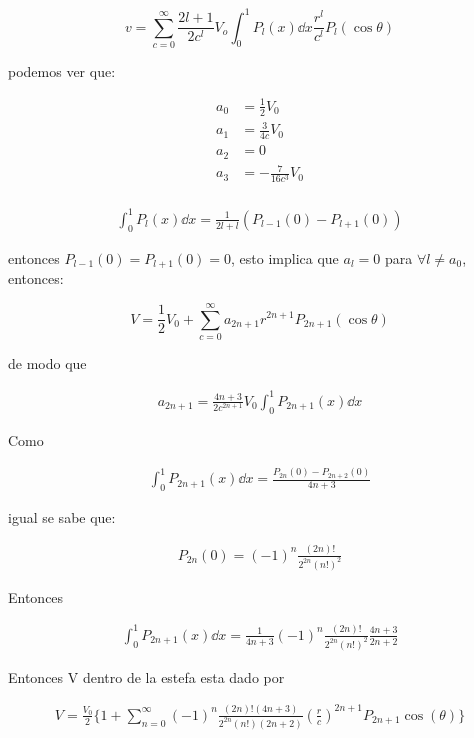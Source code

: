 \documentclass[11pt]{report}
\theoremstyle{plain}
\theoremstyle{definition}
\begin{document}
\begin{equation*}
	v=\sum^\infty_{c=0} \frac{2l+1}{2c^l}V_o\int^1_0P_l(x)\dd{x} \frac{r^l}{c^l} P_l(\cos\theta)
\end{equation*}

podemos ver que:

\begin{align*}
	a_0 &= \frac{1}{2}V_0\\
	a_1 &= \frac{3}{4c}V_0\\
	a_2 &= 0\\
	a_3 &= -\frac{7}{16c^3}V_0\\
\end{align*}

\begin{align*}
	\int^1_0 P_l(x)\dd{x} = \frac{1}{2l+l}(P_{l-1}(0)-P_{l+1}(0))
\end{align*}

entonces $P_{l-1}(0)=P_{l+1}(0)=0$, esto implica que $a_l = 0$ para $\forall l \neq a_0$, entonces:

\begin{equation*}
	V = \frac{1}{2}V_0 + \sum^\infty_{c=0} a_{2n+1}r^{2n+1}P_{2n+1}(\cos\theta)
\end{equation*}

de modo que

\begin{align*}
	a_{2n+1}=\frac{4n+3}{2c^{2n+1}}V_0\int^1_0P_{2n+1}(x)\dd{x}
\end{align*}

Como 

\begin{align*}
	\int^1_0 P_{2n+1}(x)\dd{x} = \frac{P_{2n}(0)-P_{2n+2}(0)}{4n+3}
\end{align*}


igual se sabe que:

\begin{align*}
	P_{2n}(0) = (-1)^n\frac{(2n)!}{2^{2n}(n!)^2}
\end{align*}

Entonces

\begin{align*}
	\int^1_0P_{2n+1}(x)\dd{x} = \frac{1}{4n+3} (-1)^n\frac{(2n)!}{2^{2n}(n!)^2}\frac{4n+3}{2n+2} 
\end{align*}

Entonces V dentro de la estefa esta dado por

\begin{align*}
	V = \frac{V_0}{2}\{ 1 +\sum^\infty_{n=0}(-1)^n \frac{(2n)!(4n+3)}{2^{2n}(n!)(2n+2)}\left(\frac{r}{c}\right)^{2n+1}P_{2n+1}\cos(\theta)\}
\end{align*}
\end{document}
